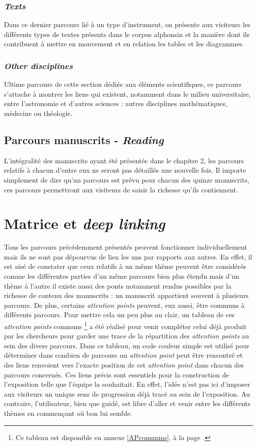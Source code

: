 	\subsubsection{\textit{Texts}}
	Dans ce dernier parcours lié à un type d'instrument, on présente aux visiteurs les différents types de textes présents dans le corpus alphonsin et la manière dont ils contribuent à mettre en mouvement et en relation les tables et les diagrammes.

	\subsubsection{\textit{Other disciplines}}
	Ultime parcours de cette section dédiée aux éléments scientifiques, ce parcours s'attache à montrer les liens qui existent, notamment dans le milieu universitaire, entre l'astronomie et d'autres sciences : autres disciplines mathématiques, médecine ou théologie.
	
	\subsection{Parcours manuscrits - \textit{Reading}}
	L'intégralité des manuscrits ayant été présentée dans le chapitre 2, les parcours relatifs à chacun d'entre eux ne seront pas détaillés une nouvelle fois. Il importe simplement de dire qu'un parcours est prévu pour chacun des quinze manuscrits, ces parcours permettront aux visiteurs de saisir la richesse qu'ils contiennent.

	\section{Matrice et \textit{deep linking}}
    Tous les parcours précédemment présentés peuvent fonctionner individuellement mais ils ne sont pas dépourvus de lien les uns par rapports aux autres. En effet, il est aisé de constater que ceux relatifs à un même thème peuvent être considérés comme les différentes parties d’un même parcours bien plus étendu mais d’un thème à l’autre il existe aussi des ponts notamment rendus possibles par la richesse de contenu des manuscrits : un manuscrit appartient souvent à plusieurs parcours. De plus, certains \textit{attention points} peuvent, eux aussi, être communs à différents parcours. Pour mettre cela un peu plus au clair, un tableau de ces \textit{attention points} communs \footnote{Ce tableau est disponible en annexe \ref{APcommuns}, à la page \pageref{APcommuns}.} a été réalisé pour venir compléter celui déjà produit par les chercheurs pour garder une trace de la répartition des \textit{attention points} au sein des divers parcours. Dans ce tableau, un code couleur simple est utilisé pour déterminer dans combien de parcours un \textit{attention point} peut être rencontré et des liens renvoient vers l’exacte position de cet \textit{attention point} dans chacun des parcours concernés. Ces liens précis sont essentiels pour la construction de l’exposition telle que l’équipe la souhaitait. En effet, l’idée n’est pas ici d’imposer aux visiteurs un unique sens de progression déjà tracé au sein de l’exposition. Au contraire, l’utilisateur, bien que guidé, est libre d’aller et venir entre les différents thèmes en commençant où bon lui semble. 
    
